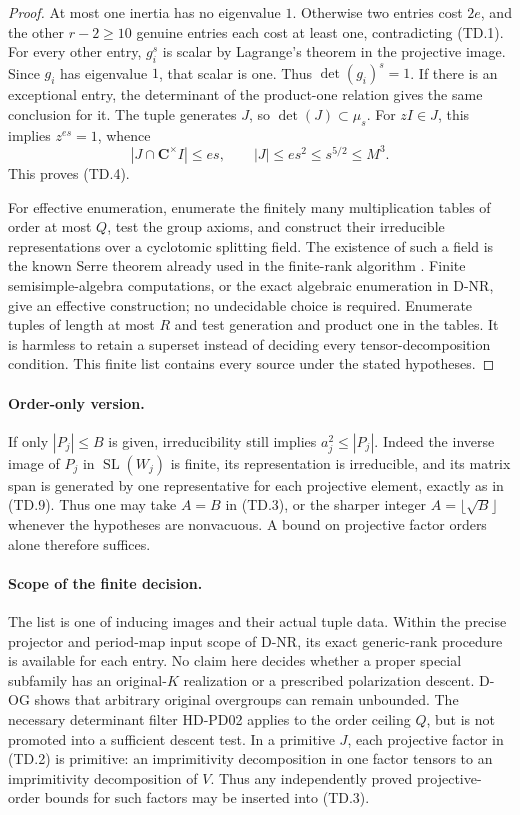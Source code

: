 \begin{proof}
At most one inertia has no eigenvalue \(1\).  Otherwise two entries
cost \(2e\), and the other \(r-2\ge10\) genuine entries each cost
at least one, contradicting (TD.1).
For every other entry, \(g_i^s\) is scalar by Lagrange's theorem
in the projective image.  Since \(g_i\) has eigenvalue \(1\),
that scalar is one.  Thus \(\det(g_i)^s=1\).
If there is an exceptional entry, the determinant of the
product-one relation gives the same conclusion for it.
The tuple generates \(J\), so \(\det(J)\subset\mu_s\).
For \(zI\in J\), this implies \(z^{es}=1\), whence
\[
 |J\cap\mathbf C^\times I|\le es,\qquad
 |J|\le es^2\le s^{5/2}\le M^3 .
 \tag{TD.10}
\]
This proves (TD.4).

For effective enumeration, enumerate the finitely many multiplication
tables of order at most \(Q\), test the group axioms, and construct
their irreducible representations over a cyclotomic splitting field.
The existence of such a field is the known Serre theorem already
used in the finite-rank algorithm
\cite[\S12.3, Theorem24, p.~94]{OG:Serre1977}.
Finite semisimple-algebra computations, or the exact algebraic
enumeration in D-NR, give an effective construction; no undecidable
choice is required.  Enumerate tuples of length at most \(R\)
and test generation and product one in the tables.
It is harmless to retain a superset instead of deciding every
tensor-decomposition condition.  This finite list contains every
source under the stated hypotheses.
\end{proof}

\paragraph{Order-only version.}
If only \(|P_j|\le B\) is given, irreducibility still implies
\(a_j^2\le |P_j|\).  Indeed the inverse image of \(P_j\) in
\(\operatorname{SL}(W_j)\) is finite, its representation is
irreducible, and its matrix span is generated by one representative
for each projective element, exactly as in (TD.9).
Thus one may take \(A=B\) in (TD.3), or the sharper integer
\(A=\lfloor\sqrt B\rfloor\) whenever the hypotheses are nonvacuous.
A bound on projective factor orders alone therefore suffices.

\paragraph{Scope of the finite decision.}
The list is one of inducing images and their actual tuple data.
Within the precise projector and period-map input scope of D-NR,
its exact generic-rank procedure is available for each entry.
No claim here decides whether a proper special subfamily has an
original-\(K\) realization or a prescribed polarization descent.
D-OG shows that arbitrary original overgroups can remain unbounded.
The necessary determinant filter HD-PD02 applies to the order
ceiling \(Q\), but is not promoted into a sufficient descent test.
In a primitive \(J\), each projective factor in (TD.2) is primitive:
an imprimitivity decomposition in one factor tensors to an
imprimitivity decomposition of \(V\).
Thus any independently proved projective-order bounds for such
factors may be inserted into (TD.3).


